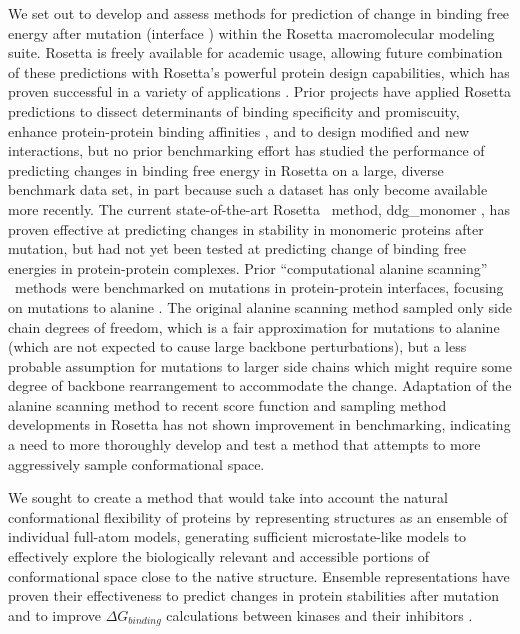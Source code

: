 We set out to develop and assess methods for prediction of change in binding free energy after mutation (interface \ddg) within the Rosetta macromolecular modeling suite. Rosetta is freely available for academic usage, allowing future combination of these predictions with Rosetta's powerful protein design capabilities, which has proven successful in a variety of applications \cite{kaufmann_practically_2010}. %
Prior projects have applied Rosetta predictions to
dissect determinants of binding specificity and promiscuity\cite{boulanger_convergent_2003,mcfarland_symmetry_2003},
enhance protein-protein binding affinities \cite{sammond_structure-based_2007,song_rational_2006},
and to design modified\cite{kortemme_computational_2004,kapp_control_2012}
and new interactions\cite{chevalier_design_2002,fleishman_computational_2011}, but no prior benchmarking effort has studied the performance of predicting changes in binding free energy in Rosetta on a large, diverse benchmark data set, in part because such a dataset has only become available more recently.
The current state-of-the-art Rosetta \ddg\ method,  ddg\_monomer \cite{kellogg_role_2011}, has proven effective at predicting changes in stability in monomeric proteins after mutation, but had not yet been tested at predicting change of binding free energies in protein-protein complexes.
Prior ``computational alanine scanning'' \ddg\ methods were benchmarked on mutations in protein-protein interfaces, focusing on mutations to alanine \cite{kortemme_simple_2002,kortemme_computational_2004,conchuir_web_2015}.
The original alanine scanning method sampled only side chain degrees of freedom, which is a fair approximation for mutations to alanine (which are not expected to cause large backbone perturbations\cite{cunningham_high-resolution_1989}), but a less probable assumption for mutations to larger side chains which might require some degree of backbone rearrangement to accommodate the change.
Adaptation of the alanine scanning method to recent score function and sampling method developments in Rosetta has not shown improvement in benchmarking\cite{conchuir_web_2015}, indicating a need to more thoroughly develop and test a method that attempts to more aggressively sample conformational space.

We sought to create a method that would take into account the natural conformational flexibility of proteins by representing structures as an ensemble of individual full-atom models, generating sufficient microstate-like models to effectively explore the biologically relevant and accessible portions of conformational space close to the native structure.
Ensemble representations have proven their effectiveness to predict changes in protein stabilities after mutation\cite{benedix_predicting_2009} and to improve $\Delta G_{binding}$ calculations between kinases and their inhibitors \cite{araki_effect_2016}.

